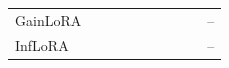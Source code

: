 {\begin{tabular}{p{1.2in}rrrrrrrrr}
    \plain{} & \AudUOriginalPlainAP{} & \AudULightPlainAP{} & \AudUMediumPlainAP{} & \AudUHeavyPlainAP{} & \AudUOriginalPlainChanged{} & \AudULightPlainChanged{} & \AudUMediumPlainChanged{} & \AudUHeavyPlainChanged{} & \AudUHeavyPlainRight{} \\
    \midrule
    GainLoRA & \AudWordOriginalGainloraAP{} & \AudWordLightGainloraAP{} & \AudWordMediumGainloraAP{} & \AudWordHeavyGainloraAP{} & \AudWordOriginalGainloraChanged{} & \AudWordLightGainloraChanged{} & \AudWordMediumGainloraChanged{} & \AudWordHeavyGainloraChanged{} & -- \\
    InfLoRA & \AudWordOriginalInfloraAP{} & \AudWordLightInfloraAP{} & \AudWordMediumInfloraAP{} & \AudWordHeavyInfloraAP{} & \AudWordOriginalInfloraChanged{} & \AudWordLightInfloraChanged{} & \AudWordMediumInfloraChanged{} & \AudWordHeavyInfloraChanged{} & -- \\
    \bottomrule
\end{tabular}}
